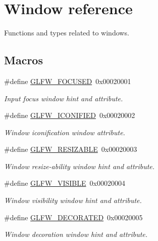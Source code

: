 \hypertarget{group__window}{}\section{Window reference}
\label{group__window}


Functions and types related to windows.  


\subsection*{Macros}
\begin{DoxyCompactItemize}
\item 
\#define \mbox{\hyperlink{group__window_ga54ddb14825a1541a56e22afb5f832a9e}{G\+L\+F\+W\+\_\+\+F\+O\+C\+U\+S\+ED}}~0x00020001
\begin{DoxyCompactList}\small\item\em Input focus window hint and attribute. \end{DoxyCompactList}\item 
\#define \mbox{\hyperlink{group__window_ga39d44b7c056e55e581355a92d240b58a}{G\+L\+F\+W\+\_\+\+I\+C\+O\+N\+I\+F\+I\+ED}}~0x00020002
\begin{DoxyCompactList}\small\item\em Window iconification window attribute. \end{DoxyCompactList}\item 
\#define \mbox{\hyperlink{group__window_gadba13c7a1b3aa40831eb2beedbd5bd1d}{G\+L\+F\+W\+\_\+\+R\+E\+S\+I\+Z\+A\+B\+LE}}~0x00020003
\begin{DoxyCompactList}\small\item\em Window resize-\/ability window hint and attribute. \end{DoxyCompactList}\item 
\#define \mbox{\hyperlink{group__window_gafb3cdc45297e06d8f1eb13adc69ca6c4}{G\+L\+F\+W\+\_\+\+V\+I\+S\+I\+B\+LE}}~0x00020004
\begin{DoxyCompactList}\small\item\em Window visibility window hint and attribute. \end{DoxyCompactList}\item 
\#define \mbox{\hyperlink{group__window_ga21b854d36314c94d65aed84405b2f25e}{G\+L\+F\+W\+\_\+\+D\+E\+C\+O\+R\+A\+T\+ED}}~0x00020005
\begin{DoxyCompactList}\small\item\em Window decoration window hint and attribute. \end{DoxyCompactList}\item 

\end{DoxyCompactItemize}
